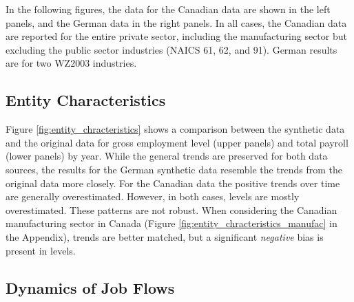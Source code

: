 
\newcommand{\CanTableNote}{$LEAP$ is the Longitudinal Employment Analysis Program and $CanSynLBD$ is the Canadian synthetic database based on LEAP. }

In the following figures, the data for the Canadian data are shown in the left panels, and the German data in the right panels. In all cases, the Canadian data are reported for the entire private sector,  including the manufacturing sector but excluding  the public sector industries (NAICS 61, 62, and 91). German results are for two WZ2003 industries.

\subsection{Entity Characteristics}



Figure \ref{fig:entity_chracteristics} shows a comparison between the synthetic data and the original data for gross employment level (upper panels) and total payroll (lower panels) by year. While the general trends are preserved for both data sources, the results for the German synthetic data resemble the trends from the original data more closely. For the Canadian data the positive trends over time are generally overestimated. However, in both cases, levels are mostly overestimated. These patterns are not robust. When considering the Canadian  manufacturing sector in Canada (Figure \ref{fig:entity_chracteristics_manufac} in the Appendix), trends are better matched, but a significant \textit{negative} bias is present in levels.



\subsection{Dynamics of Job Flows}



